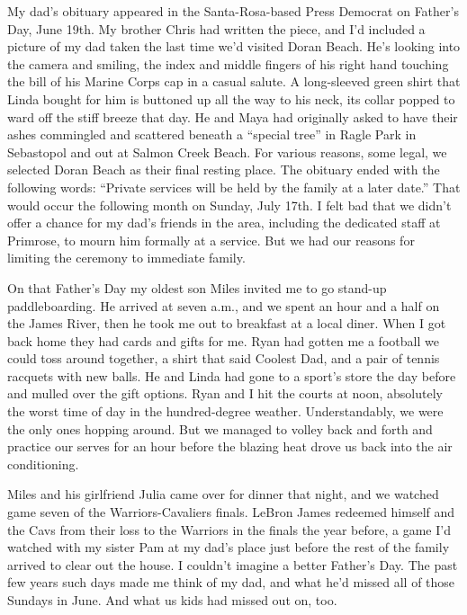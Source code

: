 \documentclass[12pt]{book}
\begin{document}
My dad's obituary appeared in the Santa-Rosa-based Press Democrat on Father's Day, June 19th. My brother Chris had written the piece, and I'd included a picture of my dad taken the last time we'd visited Doran Beach. He's looking into the camera and smiling, the index and middle fingers of his right hand touching the bill of his Marine Corps cap in a casual salute. A long-sleeved green shirt that Linda bought for him is buttoned up all the way to his neck, its collar popped to ward off the stiff breeze that day. He and Maya had originally asked to have their ashes commingled and scattered beneath a ``special tree'' in Ragle Park in Sebastopol and out at Salmon Creek Beach. For various reasons, some legal, we selected Doran Beach as their final resting place. The obituary ended with the following words: ``Private services will be held by the family at a later date.'' That would occur the following month on Sunday, July 17th. I felt bad that we didn't offer a chance for my dad's friends in the area, including the dedicated staff at Primrose, to mourn him formally at a service. But we had our reasons for limiting the ceremony to immediate family.

On that Father's Day my oldest son Miles invited me to go stand-up paddleboarding. He arrived at seven a.m., and we spent an hour and a half on the James River, then he took me out to breakfast at a local diner. When I got back home they had cards and gifts for me. Ryan had gotten me a football we could toss around together, a shirt that said Coolest Dad, and a pair of tennis racquets with new balls. He and Linda had gone to a sport's store the day before and mulled over the gift options. Ryan and I hit the courts at noon, absolutely the worst time of day in the hundred-degree weather. Understandably, we were the only ones hopping around. But we managed to volley back and forth and practice our serves for an hour before the blazing heat drove us back into the air conditioning.

Miles and his girlfriend Julia came over for dinner that night, and we watched game seven of the Warriors-Cavaliers finals. LeBron James redeemed himself and the Cavs from their loss to the Warriors in the finals the year before, a game I'd watched with my sister Pam at my dad's place just before the rest of the family arrived to clear out the house. I couldn't imagine a better Father's Day. The past few years such days made me think of my dad, and what he'd missed all of those Sundays in June. And what us kids had missed out on, too.
\end{document}
